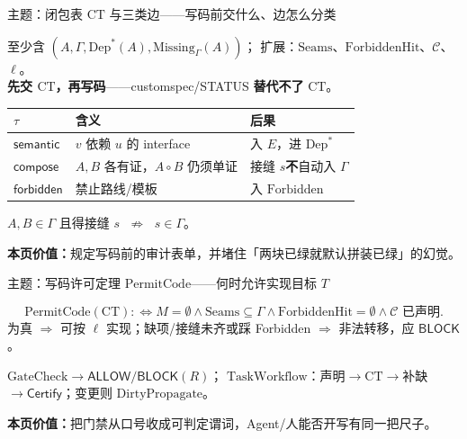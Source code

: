 \documentclass[UTF8,aspectratio=169,11pt]{ctexbeamer}
\newcommand{\pagesummary}[1]{%
  \vfill
  {\footnotesize\noindent\textbf{本页价值：}#1\par}%
}
\begin{document}
\begin{frame}{主题：闭包表 $\mathrm{CT}$ 与三类边——写码前交什么、边怎么分类}
\begin{definition}[闭包表]
至少含 $(A,\Gamma,\mathrm{Dep}^*(A),\mathrm{Missing}_\Gamma(A))$；
扩展：$\mathrm{Seams}$、$\mathrm{ForbiddenHit}$、$\mathcal{C}$、$\ell$。\\
\textbf{先交 $\mathrm{CT}$，再写码}——customspec/STATUS \textbf{替代不了} $\mathrm{CT}$。
\end{definition}
{\footnotesize
\begin{center}
\begin{tabular}{@{}L{2.1cm}L{3.8cm}L{5.4cm}@{}}
  \toprule
  $\tau$ & 含义 & 后果 \\
  \midrule
  $\mathsf{semantic}$ & $v$ 依赖 $u$ 的 interface & 入 $E$，进 $\mathrm{Dep}^*$ \\
  $\mathsf{compose}$ & $A,B$ 各有证，$A\!\circ\!B$ 仍须单证 & 接缝 $s$\textbf{不}自动入 $\Gamma$ \\
  $\mathsf{forbidden}$ & 禁止路线/模板 & 入 $\mathrm{Forbidden}$ \\
  \bottomrule
\end{tabular}
\end{center}
}
\begin{theorem}[组合不免费]
$A,B\in\Gamma$ 且得接缝 $s$ $\;\not\Rightarrow\;$ $s\in\Gamma$。
\end{theorem}
\pagesummary{规定写码前的审计表单，并堵住「两块已绿就默认拼装已绿」的幻觉。}
\end{frame}

\begin{frame}{主题：写码许可定理 $\mathrm{PermitCode}$——何时允许实现目标 $T$}
\begin{theorem}[写码许可的充要条件（v0，教材）]
\[
\mathrm{PermitCode}(\mathrm{CT})
:\iff
M=\emptyset
\land\mathrm{Seams}\subseteq\Gamma
\land\mathrm{ForbiddenHit}=\emptyset
\land\mathcal{C}\text{ 已声明}.
\]
为真 $\Rightarrow$ 可按 $\ell$ 实现；缺项/接缝未齐或踩 Forbidden $\Rightarrow$ 非法转移，应 $\mathsf{BLOCK}$。
\end{theorem}
{\footnotesize
$\mathrm{GateCheck}\to\mathsf{ALLOW}/\mathsf{BLOCK}(R)$；
$\mathrm{TaskWorkflow}$：声明$\to\mathrm{CT}\to$补缺$\to\mathsf{Certify}$；变更则 $\mathrm{DirtyPropagate}$。
}
\pagesummary{把门禁从口号收成可判定谓词，Agent/人能否开写有同一把尺子。}
\end{frame}
\end{document}
